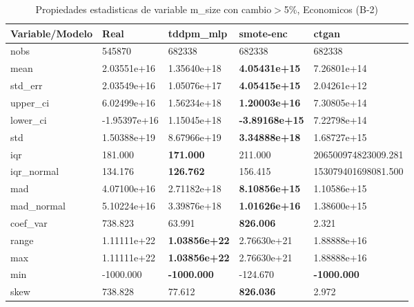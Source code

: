 \begin{table}[H]
\centering
\fontsize{8}{14}\selectfont
\caption{Propiedades estadisticas de variable m\_size con cambio\ensuremath{>}5\%, Economicos (B-2)}
\label{table-stats-economicos-b-2-m_size-short}
\begin{tabular}{|l|m{10em}|m{10em}|m{10em}|m{10em}|}
\hline
 \rowcolor[gray]{0.8}
Variable/Modelo & Real & tddpm\_mlp & smote-enc & ctgan \\
\hline nobs & 545870 & 682338 & 682338 & 682338 \\
\hline mean & 2.03551e+16 & \cellcolor[rgb]{0.9, 0.54, 0.52} 1.35640e+18 & \bfseries 4.05431e+15 & 7.26801e+14 \\
\hline std\_err & 2.03549e+16 & \cellcolor[rgb]{0.9, 0.54, 0.52} 1.05076e+17 & \bfseries 4.05415e+15 & 2.04261e+12 \\
\hline upper\_ci & 6.02499e+16 & \cellcolor[rgb]{0.9, 0.54, 0.52} 1.56234e+18 & \bfseries 1.20003e+16 & 7.30805e+14 \\
\hline lower\_ci & -1.95397e+16 & \cellcolor[rgb]{0.9, 0.54, 0.52} 1.15045e+18 & \bfseries -3.89168e+15 & 7.22798e+14 \\
\hline std & 1.50388e+19 & \cellcolor[rgb]{0.9, 0.54, 0.52} 8.67966e+19 & \bfseries 3.34888e+18 & 1.68727e+15 \\
\hline iqr & 181.000 & \bfseries 171.000 & 211.000 & \cellcolor[rgb]{0.9, 0.54, 0.52} 206500974823009.281 \\
\hline iqr\_normal & 134.176 & \bfseries 126.762 & 156.415 & \cellcolor[rgb]{0.9, 0.54, 0.52} 153079401698081.500 \\
\hline mad & 4.07100e+16 & \cellcolor[rgb]{0.9, 0.54, 0.52} 2.71182e+18 & \bfseries 8.10856e+15 & 1.10586e+15 \\
\hline mad\_normal & 5.10224e+16 & \cellcolor[rgb]{0.9, 0.54, 0.52} 3.39876e+18 & \bfseries 1.01626e+16 & 1.38600e+15 \\
\hline coef\_var & 738.823 & 63.991 & \bfseries 826.006 & \cellcolor[rgb]{0.9, 0.54, 0.52} 2.321 \\
\hline range & 1.11111e+22 & \bfseries 1.03856e+22 & 2.76630e+21 & \cellcolor[rgb]{0.9, 0.54, 0.52} 1.88888e+16 \\
\hline max & 1.11111e+22 & \bfseries 1.03856e+22 & 2.76630e+21 & \cellcolor[rgb]{0.9, 0.54, 0.52} 1.88888e+16 \\
\hline min & -1000.000 & \bfseries -1000.000 & \cellcolor[rgb]{0.9, 0.54, 0.52} -124.670 & \bfseries -1000.000 \\
\hline skew & 738.828 & 77.612 & \bfseries 826.036 & \cellcolor[rgb]{0.9, 0.54, 0.52} 2.972 \\

\end{tabular}
\end{table}

